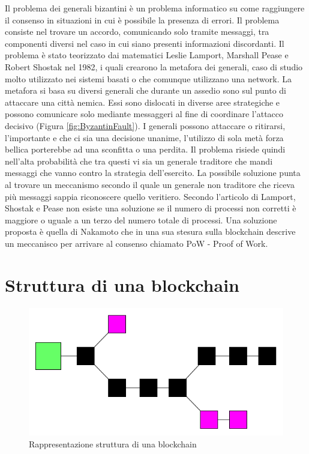 \documentclass[11pt,a4paper,titlepage, twoside, openright]{report}
\begin{document}
Il problema dei generali bizantini è un problema informatico su come raggiungere il consenso in situazioni in cui è possibile la presenza di errori. Il problema consiste nel trovare un accordo, comunicando solo tramite messaggi, tra componenti diversi nel caso in cui siano presenti informazioni discordanti. Il problema è stato teorizzato dai matematici Leslie Lamport, Marshall Pease e Robert Shostak nel 1982, i quali crearono la metafora dei generali, caso di studio molto utilizzato nei sistemi basati o che comunque utilizzano una network. La metafora si basa su diversi generali che durante un assedio sono sul punto di attaccare una città nemica. Essi sono dislocati in diverse aree strategiche e possono comunicare solo mediante messaggeri al fine di coordinare l'attacco decisivo (Figura \ref{fig:ByzantinFault}). I generali possono attaccare o ritirarsi, l'importante e che ci sia una decisione unanime, l'utilizzo di sola metà forza bellica porterebbe ad una sconfitta o una perdita. Il problema risiede quindi nell'alta probabilità che tra questi vi sia un generale traditore che mandi messaggi che vanno contro la strategia dell'esercito. La possibile soluzione punta al trovare un meccanismo secondo il quale un generale non traditore che riceva più messaggi sappia riconoscere quello veritiero. Secondo l'articolo di Lamport, Shostak e Pease non esiste una soluzione se il numero di processi non corretti è maggiore o uguale a un terzo del numero totale di processi. Una soluzione proposta è quella di Nakamoto che in una sua stesura sulla blockchain descrive un meccanisco per arrivare al consenso chiamato PoW - Proof of Work.

\section{Struttura di una blockchain}

\begin{figure}[h]
	\includegraphics[width=\textwidth]{bl1}
	\centering
	\caption{Rappresentazione struttura di una blockchain}
	\label{fig:blockchain1}
\end{figure}
\end{document}
